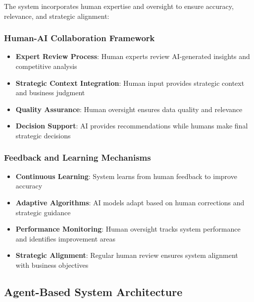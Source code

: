 The system incorporates human expertise and oversight to ensure accuracy, relevance, and strategic alignment:

\subsubsection{Human-AI Collaboration Framework}
\begin{itemize}
    \item \textbf{Expert Review Process}: Human experts review AI-generated insights and competitive analysis
    \item \textbf{Strategic Context Integration}: Human input provides strategic context and business judgment
    \item \textbf{Quality Assurance}: Human oversight ensures data quality and relevance
    \item \textbf{Decision Support}: AI provides recommendations while humans make final strategic decisions
\end{itemize}

\subsubsection{Feedback and Learning Mechanisms}
\begin{itemize}
    \item \textbf{Continuous Learning}: System learns from human feedback to improve accuracy
    \item \textbf{Adaptive Algorithms}: AI models adapt based on human corrections and strategic guidance
    \item \textbf{Performance Monitoring}: Human oversight tracks system performance and identifies improvement areas
    \item \textbf{Strategic Alignment}: Regular human review ensures system alignment with business objectives
\end{itemize}

\subsection{Agent-Based System Architecture}

